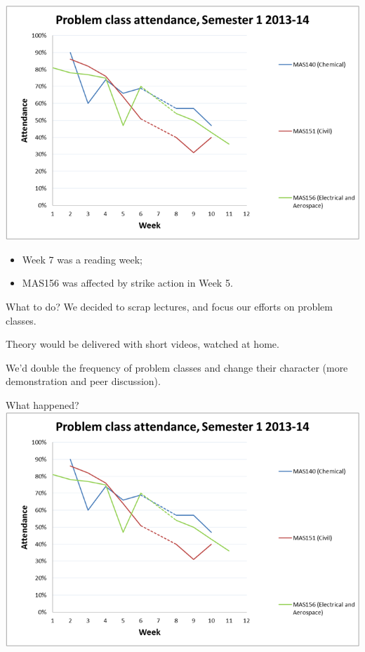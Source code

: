 \documentclass[12pt,envcountsect]{beamer}
\theoremstyle{plain}
\theoremstyle{definition}
\begin{document}
\begin{frame}
\includegraphics[width=1\textwidth]{attendance_sem1_no_MAS152.png}


\begin{itemize}
\item Week 7 was a reading week;
\item MAS156 was affected by strike action in Week 5.
\end{itemize}

\end{frame}

\begin{frame}{What to do?}\pause
We decided to scrap lectures, and focus our efforts on problem classes.\pause

Theory would be delivered with short videos, watched at home.\pause

We'd double the frequency of problem classes and change their character (more demonstration and peer discussion).
\end{frame}

\begin{frame}{What happened?}
\includegraphics[width=1\textwidth]{attendance_sem1_no_MAS152.png}

\vspace{10ex}
\end{frame}
\end{document}
